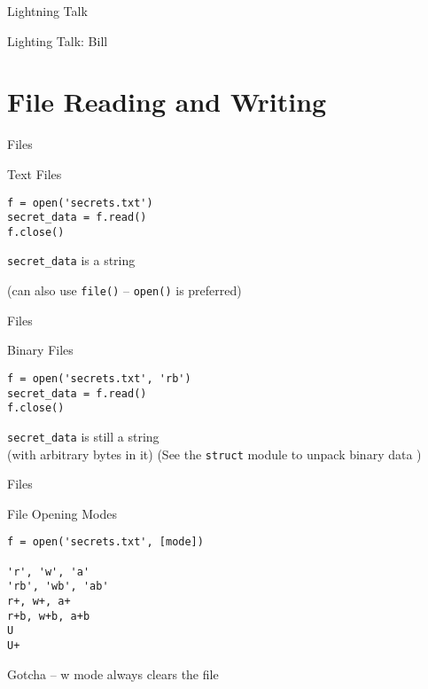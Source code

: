 \documentclass{beamer}
\begin{document}
\begin{frame}{Lightning Talk}

{\center

\LARGE Lighting Talk:
\vfill
Bill
\vfill

}

\end{frame}

\section{File Reading and Writing}

\begin{frame}[fragile]{Files}

{\Large Text Files}

\begin{verbatim}
f = open('secrets.txt')
secret_data = f.read()
f.close()
\end{verbatim}

{\Large \verb|secret_data| is a string}

\vfill
(can also use \verb|file()| -- \verb|open()| is preferred)
\end{frame}

\begin{frame}[fragile]{Files}

{\Large Binary Files}

\begin{verbatim}
f = open('secrets.txt', 'rb')
secret_data = f.read()
f.close()
\end{verbatim}

{\Large \verb|secret_data| is still a string \\[.1in]
(with arbitrary bytes in it)}
\vfill
(See the \verb|struct| module to unpack binary data )
\end{frame}

\begin{frame}[fragile]{Files}

{\Large File Opening Modes}
\vfill
\begin{verbatim}
f = open('secrets.txt', [mode])

'r', 'w', 'a'
'rb', 'wb', 'ab'
r+, w+, a+
r+b, w+b, a+b
U
U+
\end{verbatim}
\vfill
{\Large Gotcha -- w mode always clears the file}
\end{frame}
\end{document}
